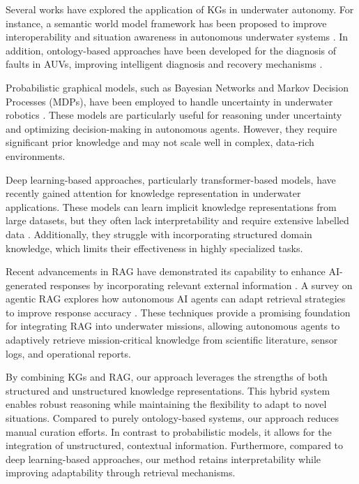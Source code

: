 \documentclass[journal]{IEEEtran}
\begin{document}
Several works have explored the application of KGs in underwater autonomy. For instance, a semantic world model framework has been proposed to improve interoperability and situation awareness in autonomous underwater systems \cite{5432174}. In addition, ontology-based approaches have been developed for the diagnosis of faults in  AUVs, improving intelligent diagnosis and recovery mechanisms \cite{article}.

Probabilistic graphical models, such as Bayesian Networks and Markov Decision Processes (MDPs), have been employed to handle uncertainty in underwater robotics \cite{li2017towards, hegde2018bayesian}. These models are particularly useful for reasoning under uncertainty and optimizing decision-making in autonomous agents. However, they require significant prior knowledge and may not scale well in complex, data-rich environments.

Deep learning-based approaches, particularly transformer-based models, have recently gained attention for knowledge representation in underwater applications. These models can learn implicit knowledge representations from large datasets, but they often lack interpretability and require extensive labelled data \cite{zhang2022underwater}. Additionally, they struggle with incorporating structured domain knowledge, which limits their effectiveness in highly specialized tasks.


Recent advancements in RAG have demonstrated its capability to enhance AI-generated responses by incorporating relevant external information \cite{li2025enhancingretrievalaugmentedgenerationstudy}. A survey on agentic RAG explores how autonomous AI agents can adapt retrieval strategies to improve response accuracy \cite{singh2025agenticretrievalaugmentedgenerationsurvey}. These techniques provide a promising foundation for integrating RAG into underwater missions, allowing autonomous agents to adaptively retrieve mission-critical knowledge from scientific literature, sensor logs, and operational reports.

By combining KGs and RAG, our approach leverages the strengths of both structured and unstructured knowledge representations. This hybrid system enables robust reasoning while maintaining the flexibility to adapt to novel situations. Compared to purely ontology-based systems, our approach reduces manual curation efforts. In contrast to probabilistic models, it allows for the integration of unstructured, contextual information. Furthermore, compared to deep learning-based approaches, our method retains interpretability while improving adaptability through retrieval mechanisms.
\end{document}
